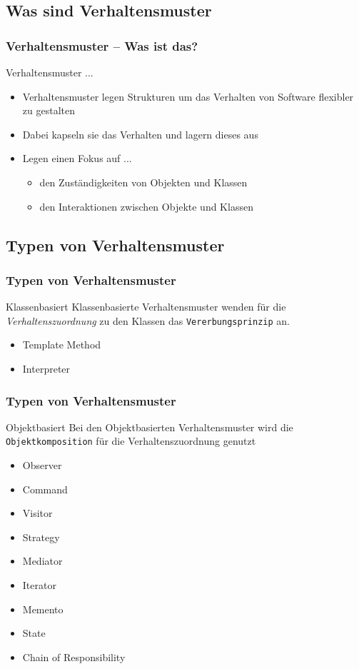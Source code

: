 \subsection{Was sind Verhaltensmuster}


\begin{frame}
	\frametitle{Verhaltensmuster -- Was ist das?}
	\begin{block}{Verhaltensmuster ...}
	\begin{itemize}
		\item Verhaltensmuster legen Strukturen um das Verhalten von Software flexibler zu gestalten
		\item Dabei kapseln sie das Verhalten und lagern dieses aus
		\item Legen einen Fokus auf ...
		\begin{itemize}
			\item den Zuständigkeiten von Objekten und Klassen
			\item den Interaktionen zwischen Objekte und Klassen
		\end{itemize}
	\end{itemize}
	\end{block}	
\end{frame}


\subsection{Typen von Verhaltensmuster}
\begin{frame}
	\frametitle{Typen von Verhaltensmuster}
	\begin{block}{Klassenbasiert}
		Klassenbasierte Verhaltensmuster wenden für die \textit{Verhaltenszuordnung} zu den Klassen das \texttt{Vererbungsprinzip} an. 
		\begin{itemize}
			\item Template Method
			\item Interpreter
		\end{itemize} 	
	\end{block}
\end{frame}

\begin{frame}
	\frametitle{Typen von Verhaltensmuster}
	\begin{block}{Objektbasiert}
		Bei den Objektbasierten Verhaltensmuster wird die \texttt{Objektkomposition} für die Verhaltenszuordnung genutzt
				\begin{itemize}
					\item \alert<1-> {Observer}
					\item \alert<1-> {Command}
					\item \alert<1-> {Visitor}
					\item Strategy			
					\item Mediator
					\item Iterator
					\item Memento 
					\item State
					\item Chain of Responsibility
				\end{itemize}	
	\end{block}
\end{frame}
